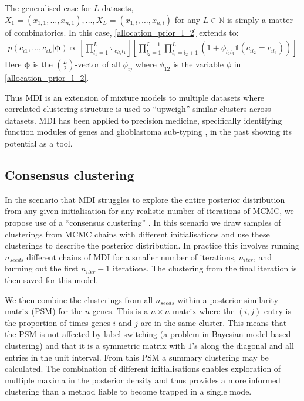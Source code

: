\documentclass[12pt]{article} %
\begin{document}
	The generalised case for $L$ datasets, $X_1 = (x_{1,1},\ldots,x_{n,1}),\ldots, X_L = (x_{1,l},\ldots,x_{n,l})$ for any $L \in \mathbb{N}$ is simply a matter of combinatorics. In this case, \eqref{allocation_prior_l_2} extends to:
	\begin{align} \label{allocation_prior}
	p(c_{i1},\ldots,c_{iL} | \boldsymbol{\phi}) \propto \left[\prod_{l_1=1}^L\pi_{c_{il_1}l_1} \right]\left[\prod_{l_2=1}^{L-1}\prod_{l_3=l_2+1}^L\left(1+\phi_{l_2l_3}\mathbb{1}(c_{il_2} = c_{il_3}) \right)\right]
	\end{align}
	Here $\boldsymbol{\phi}$ is the ${L \choose 2}$-vector of all $\phi_{ij}$ where $\phi_{12}$ is the variable $\phi$ in \eqref{allocation_prior_l_2}.

	Thus MDI is an extension of mixture models to multiple datasets where correlated clustering structure is used to ``upweigh'' similar clusters across datasets. MDI has been applied to precision medicine, specifically identifying function modules of genes and glioblastoma sub-typing \cite{SavageIdentifyingcancersubtypes2013a}, in the past showing its potential as a tool.
	
	\subsection{Consensus clustering} \label{sec:consensus_clustering}
	In the scenario that MDI struggles to explore the entire posterior distribution from any given initialisation for any realistic number of iterations of MCMC, we propose use of a ``consensus clustering'' \cite{MontiConsensusClusteringResamplingBased}. In this scenario we draw samples of clusterings from MCMC chains with different initialisations and use these clusterings to describe the posterior distribution. In practice this involves running $n_{seeds}$ different chains of MDI for a smaller number of iterations, $n_{iter}$, and burning out the first $n_{iter} - 1$ iterations. The clustering from the final iteration is then saved for this model.
	
	We then combine the clusterings from all $n_{seeds}$ within a posterior similarity matrix (PSM) for the $n$ genes. This is a $n \times n$ matrix where the $(i,j)$ entry is the proportion of times genes $i$ and $j$ are in the same cluster. This means that the PSM is not affected by label switching (a problem in Bayesian model-based clustering) and that it is a symmetric matrix with $1$'s along the diagonal and all entries in the unit interval. From this PSM a summary clustering may be calculated. The combination of different initialisations enables exploration of multiple maxima in the posterior density and thus provides a more informed clustering than a method liable to become trapped in a single mode. 
	
\end{document}
